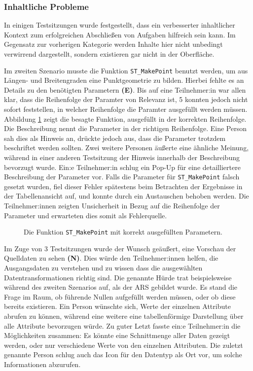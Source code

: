 \subsubsection{Inhaltliche Probleme}
In einigen Testsitzungen wurde festgestellt, dass ein verbesserter inhaltlicher Kontext zum erfolgreichen Abschließen von Aufgaben hilfreich sein kann. Im Gegensatz zur vorherigen Kategorie werden Inhalte hier nicht unbedingt verwirrend dargestellt, sondern existieren gar nicht in der Oberfläche.

Im zweiten Szenario musste die Funktion \texttt{ST\_MakePoint} benutzt werden, um aus Längen- und Breitengraden eine Punktgeometrie zu bilden. Hierbei fehlte es an Details zu den benötigten Parametern \textbf{(E)}. Bis auf eine Teilnehmer:in war allen klar, dass die Reihenfolge der Paramter von Relevanz ist, 5 konnten jedoch nicht sofort feststellen, in welcher Reihenfolge die Paramter ausgefüllt werden müssen. Abbildung \ref{fig:parameters} zeigt die besagte Funktion, ausgefüllt in der korrekten Reihenfolge. Die Beschreibung nennt die Parameter in der richtigen Reihenfolge. Eine Person sah dies als Hinweis an, drückte jedoch aus, dass die Parameter trotzdem beschriftet werden sollten. Zwei weitere Personen äußerte eine ähnliche Meinung, während in einer anderen Testsitzung der Hinweis innerhalb der Beschreibung bevorzugt wurde. Ein:e Teilnehmer:in schlug ein Pop-Up für eine detailliertere Beschreibung der Parameter vor. Falls die Parameter für \texttt{ST\_MakePoint} falsch gesetzt wurden, fiel dieser Fehler spätestens beim Betrachten der Ergebnisse in der Tabellenansicht auf, und konnte durch ein Austauschen behoben werden. Die Teilnehmer:innen zeigten Unsicherheit in Bezug auf die Reihenfolge der Parameter und erwarteten dies somit als Fehlerquelle.

\begin{figure}
  \centering
  \caption{Die Funktion \texttt{ST\_MakePoint} mit korrekt ausgefüllten Parametern.}
  \label{fig:parameters}
\end{figure}

Im Zuge von 3 Testsitzungen wurde der Wunsch geäußert, eine Vorschau der Quelldaten zu sehen \textbf{(N)}. Dies würde den Teilnehmer:innen helfen, die Ausgangsdaten zu verstehen und zu wissen dass die ausgewählten Datentransformationen richtig sind. Die genannte Hürde trat beispielsweise während des zweiten Szenarios auf, als der \ac{ARS} gebildet wurde. Es stand die Frage im Raum, ob führende Nullen aufgefüllt werden müssen, oder ob diese bereits existieren. Ein Person wünschte sich, Werte der einzelnen Attribute abrufen zu können, während eine weitere eine tabellenförmige Darstellung über alle Attribute bevorzugen würde. Zu guter Letzt fasste ein:e Teilnehmer:in die Möglichkeiten zusammen: Es könnte eine Schnittmenge aller Daten gezeigt werden, oder nur verschiedene Werte von den einzelnen Attributen. Die zuletzt genannte Person schlug auch das Icon für den Datentyp als Ort vor, um solche Informationen abzurufen.

